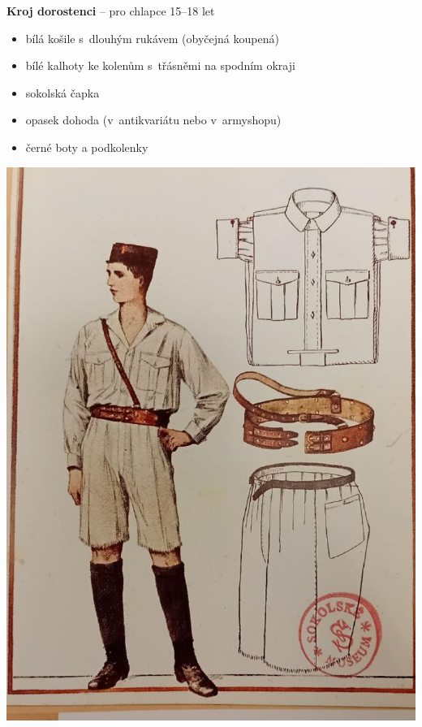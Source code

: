 \documentclass[11pt]{article}
\begin{document}
\begin{minipage}{0.6\linewidth}
  \center
  \textbf{Kroj dorostenci} – pro chlapce 15–18 let

  \begin{itemize}[itemsep=-3pt,leftmargin=2em]
    \item bílá košile s~dlouhým rukávem (obyčejná koupená)
    \item bílé kalhoty ke kolenům s~třásněmi na spodním okraji
    \item sokolská čapka
    \item opasek \luv{}dohoda\ruv{} (v~antikvariátu nebo v~armyshopu)
    \item černé boty a podkolenky
  \end{itemize}
\end{minipage}
\begin{minipage}{0.3\linewidth}
  \hspace*{1em}
  \includegraphics[width=0.98\linewidth]{kroj_dorostenec.png} 
\end{minipage}
\end{document}
